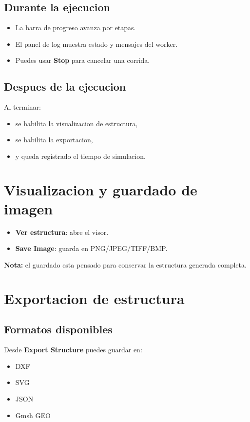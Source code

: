 \documentclass[11pt,a4paper]{article}
\begin{document}
\subsection{Durante la ejecucion}
\begin{itemize}[leftmargin=1.5em]
  \item La barra de progreso avanza por etapas.
  \item El panel de log muestra estado y mensajes del worker.
  \item Puedes usar \textbf{Stop} para cancelar una corrida.
\end{itemize}

\subsection{Despues de la ejecucion}
Al terminar:
\begin{itemize}[leftmargin=1.5em]
  \item se habilita la visualizacion de estructura,
  \item se habilita la exportacion,
  \item y queda registrado el tiempo de simulacion.
\end{itemize}

\section{Visualizacion y guardado de imagen}
\begin{itemize}[leftmargin=1.5em]
  \item \textbf{Ver estructura}: abre el visor.
  \item \textbf{Save Image}: guarda en PNG/JPEG/TIFF/BMP.
\end{itemize}

\textbf{Nota:} el guardado esta pensado para conservar la estructura generada completa.

\section{Exportacion de estructura}
\subsection{Formatos disponibles}
Desde \textbf{Export Structure} puedes guardar en:
\begin{itemize}[leftmargin=1.5em]
  \item DXF
  \item SVG
  \item JSON
  \item Gmsh GEO
\end{itemize}
\end{document}
